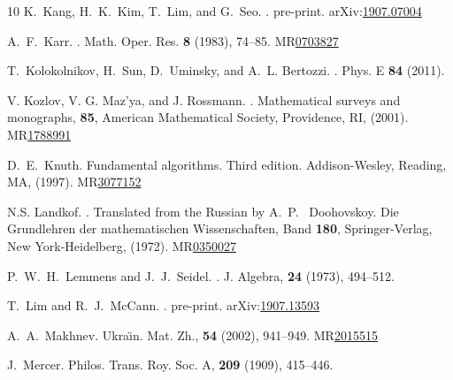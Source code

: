 \documentclass[11pt, leqno]{amsart}
\def\arXiv#1{arXiv:\href{http://arXiv.org/abs/#1}{#1}}
\def\MR#1{MR\href{http://www.ams.org/mathscinet-getitem?mr=#1}{#1}}
\theoremstyle{definition}
\numberwithin{equation}{section}
\begin{document}
\begin{thebibliography}{10}
K.~Kang, H.~K.~Kim, T.~Lim, and G.~Seo.
.
\newblock pre-print.
\arXiv{1907.07004}

A.~F.~Karr.
.
\newblock Math. Oper. Res. {\bf 8} (1983), 74--85.
\MR{0703827}

T.~Kolokolnikov, H.~Sun, D.~Uminsky, and A.~L. Bertozzi.
.
\newblock Phys. E {\bf 84} (2011).


V. Kozlov, V. G. Maz'ya, and  J. Rossmann.
.
\newblock Mathematical surveys and monographs, {\bf 85}, American Mathematical Society, Providence, RI, (2001).
\MR{1788991}

D.~E.~Knuth.
\newblock Fundamental algorithms. Third edition. Addison-Wesley, Reading, MA, (1997).
\MR{3077152}

N.S. Landkof.
.
\newblock Translated from the Russian by A.~P.~ Doohovskoy.
\newblock Die Grundlehren der mathematischen Wissenschaften, Band {\bf 180}, Springer-Verlag, New York-Heidelberg, (1972).
\MR{0350027}




P.~W.~H.~Lemmens and J.~J.~Seidel.
. 
\newblock J. Algebra, {\bf 24} (1973), 494--512.

T.~Lim and R.~J.~McCann.
.
\newblock pre-print.
\arXiv{1907.13593}

A.~A.~Makhnev.
\newblock Ukra\"{\i}n. Mat. Zh., {\bf 54} (2002), 941--949.
\MR{2015515}


J.~Mercer.
\newblock Philos. Trans. Roy. Soc. A, {\bf 209} (1909), 415--446.


\end{thebibliography}
\end{document}
